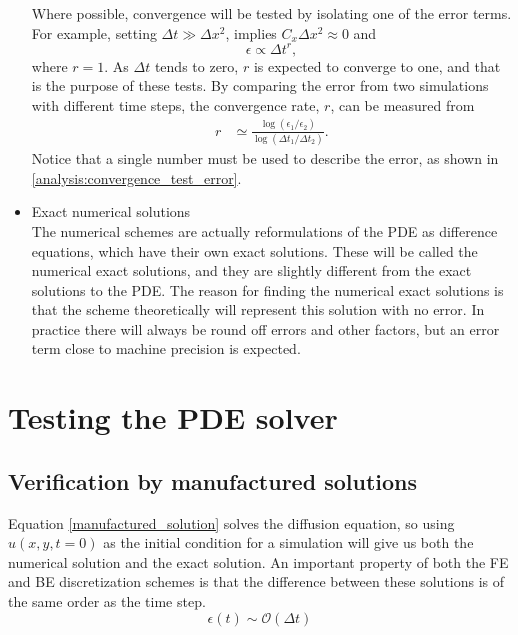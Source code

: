 \begin{itemize}
Where possible, convergence will be tested by isolating one of the error terms. For example, setting $\Delta t \gg \Delta x^2$, implies $C_x\Delta x^2\approx0$ and 
$$
\epsilon \propto \Delta t^r,
$$
where $r=1$. 
As $\Delta t$ tends to zero, $r$ is expected to converge to one, and that is the purpose of these tests. 
By comparing the error from two simulations with different time steps, the convergence rate, $r$, can be measured from 
 \begin{align*}
   r&\simeq \frac{\log\left(\epsilon_1/\epsilon_2\right)}{\log\left(\Delta t_1/\Delta t_2\right)}.
\end{align*}
Notice that a single number must be used to describe the error, as shown in \eqref{analysis:convergence_test_error}.

  \item Exact numerical solutions \\
  The numerical schemes are actually reformulations of the PDE as difference equations, which have their own exact solutions. 
  These will be called the numerical exact solutions, and they are slightly different from the exact solutions to the PDE. 
  The reason for finding the numerical exact solutions is that the scheme theoretically will represent this solution with no error. 
  In practice there will always be round off errors and other factors, but an error term close to machine precision is expected.
\end{itemize}

\section{Testing the PDE solver}


\subsection{Verification by manufactured solutions}\label{analysis:section_manufactured_solution}

Equation \eqref{manufactured_solution} solves the diffusion equation, so using $u(x,y,t=0)$ as the initial condition for a simulation will give us both the numerical solution and the exact solution. 
An important property of both the FE and BE discretization schemes is that the difference between these solutions is of the same order as the time step.
\begin{equation*}
 \epsilon(t) \sim \mathcal{O}(\Delta t)
\end{equation*}

